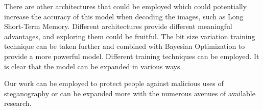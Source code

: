 \documentclass[conference]{IEEEtran}
\begin{document}
There are other architectures that could be employed which could potentially increase the accuracy of this model when decoding the images, such as Long Short-Term Memory. Different architectures provide different meaningful advantages, and exploring them could be fruitful. The bit size variation training technique can be taken further and combined with Bayesian Optimization to provide a more powerful model. Different training techniques can be employed. It is clear that the model can be expanded in various ways.

Our work can be employed to protect people against malicious uses of steganography or can be expanded more with the numerous avenues of available research.



\end{document}
